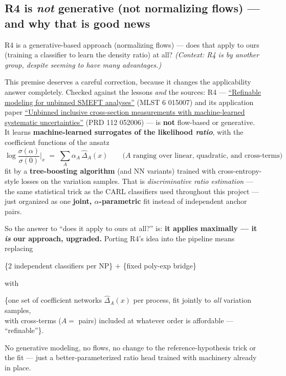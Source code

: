 \documentclass[11pt]{article}
\begin{document}
\subsection{R4 is \emph{not} generative (not normalizing flows) --- and why that is good news}\label{sec:r4}

\begin{qbox}[Question]
R4 is a generative-based approach (normalizing flows) --- does that apply to ours (training a classifier to
learn the density ratio) at all? \emph{(Context: R4 is by another group, despite seeming to have many
advantages.)}
\end{qbox}

This premise deserves a careful correction, because it changes the applicability answer completely. Checked
against the lessons \emph{and} the sources: R4 ---
\href{https://arxiv.org/abs/2406.19076}{``Refinable modeling for unbinned SMEFT analyses''} (MLST 6 015007) and
its application paper
\href{https://arxiv.org/abs/2505.05544}{``Unbinned inclusive cross-section measurements with machine-learned
systematic uncertainties''} (PRD 112 052006) --- is \textbf{not} flow-based or generative. It learns
\textbf{machine-learned surrogates of the likelihood \emph{ratio}}, with the coefficient functions of the
ansatz
\begin{equation}
\log\frac{\sigma(\alpha)}{\sigma(0)}\Big|_x\;=\;\sum_A \alpha_A\,\hat\Delta_A(x)
\qquad\text{($A$ ranging over linear, quadratic, and cross-terms)}
\end{equation}
fit by a \textbf{tree-boosting algorithm} (and NN variants) trained with cross-entropy-style losses on the
variation samples. That is \emph{discriminative ratio estimation} --- the same statistical trick as the CARL
classifiers used throughout this project --- just organized as one \textbf{joint, $\alpha$-parametric} fit
instead of independent anchor pairs.

So the answer to ``does it apply to ours at all?'' is: \textbf{it applies maximally --- it \emph{is} our
approach, upgraded.} Porting R4's idea into the pipeline means replacing
\begin{center}
\{2 independent classifiers per NP\} $+$ \{fixed poly-exp bridge\}
\end{center}
with
\begin{center}
\{one set of coefficient networks $\hat\Delta_A(x)$ per process, fit jointly to \emph{all} variation samples,\\
with cross-terms ($A=$ pairs) included at whatever order is affordable --- ``refinable''\}.
\end{center}
No generative modeling, no flows, no change to the reference-hypothesis trick or the fit --- just a
better-parameterized ratio head trained with machinery already in place.
\end{document}
